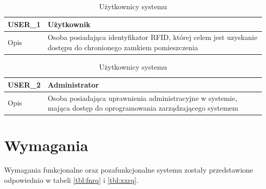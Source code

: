         \begin{table}[h!]
            \caption{Użytkownicy systemu}
            \centering
            \begin{subtable}[c]{\textwidth}
                \centering
                \begin{tabular}{|p{2cm}|p{12cm}|}
                    \hline USER\_1      & \textbf{Użytkownik} \\
                    \hline \cellcolor[gray]{0.8} Opis         & Osoba posiadająca identyfikator RFID, której celem jest uzyskanie dostępu do chronionego zamkiem pomieszczenia  \\
                    \hline
                \end{tabular}
                \label{tbl:usr1}
                \vspace{10mm}           
            \end{subtable}
        \quad%
            \begin{subtable}[c]{\textwidth}
                \centering
                \begin{tabular}{|p{2cm}|p{12cm}|}
                    \hline USER\_2      & \textbf{Administrator} \\
                    \hline \cellcolor[gray]{0.8} Opis         & Osoba posiadająca uprawnienia administracyjne w systemie, mająca dostęp do oprogramowania zarządzającego systemem \\
                    \hline
                \end{tabular}
                \label{tbl:usr2}       
            \end{subtable}                
            \label{tbl:users}
        \end{table}

    \section{Wymagania}

        Wymagania funkcjonalne oraz pozafunkcjonalne systemu zostały przedstawione odpowiednio w tabeli \ref{tbl:fnrq} i \ref{tbl:xxrq}.

